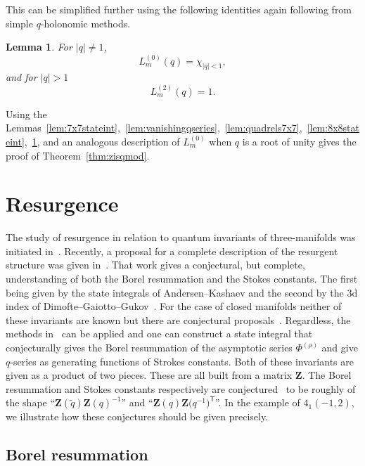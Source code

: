 \documentclass[pdftex]{sigma}
\numberwithin{equation}{section}
\newtheorem{Lemma}[Theorem]{Lemma}
\def\tq{\tilde{q}}
\def\tq{\tilde{q}}
\begin{document}
This can be simplified further using the following identities again following from simple $q$-holonomic methods.
\begin{Lemma}\label{lem:inhom.vanishingqseries}
For $|q|\neq1$,
\[
 L^{(0)}_{m}(q)
  =\chi_{|q|<1} ,
\]
and for $|q|>1$
\[
 L^{(2)}_m(q) =1 .
\]
\end{Lemma}
Using the Lemmas~\ref{lem:7x7stateint},~\ref{lem:vanishingqseries},~\ref{lem:quadrels7x7},~\ref{lem:8x8stateint},~\ref{lem:inhom.vanishingqseries}, and an analogous description of $L^{(0)}_{m}$ when $q$ is a root of unity gives the proof of Theorem~\ref{thm:zisqmod}.

\section{Resurgence}
\label{res}

The study of resurgence in relation to quantum invariants of three-manifolds was initiated in~\cite{Gar:resCS}. Recently, a proposal for a complete description of the resurgent structure was given in~\cite{GGM:I,GGMW}. That work gives a conjectural, but complete, understanding of both the Borel resummation and the Stokes constants. The first being given by the state integrals of Andersen--Kashaev and the second by the 3d index of Dimofte--Gaiotto--Gukov~\cite{DGG}. For the case of closed manifolds neither of these invariants are known but there are conjectural proposals~\cite{Gang3d}. Regardless, the methods in~\cite{GGM:I,GGMW} can be applied and one can construct a state integral that conjecturally gives the Borel resummation of the asymptotic series $\Phi^{(\rho)}$ and give $q$-series as generating functions of Strokes constants. Both of these invariants are given as a product of two pieces. These are all built from a matrix $\mathbf{Z}$. The Borel resummation and Stokes constants respectively are conjectured~\cite{GGM:I,GPPV} to be roughly of the shape
``$\mathbf{Z}(\tq)\mathbf{Z}(q)^{-1}$''  and ``$\mathbf{Z}(q)\mathbf{Z}\bigl(q^{-1}\bigr)^{\mathsf{T}}$''.
In the example of $4_1(-1,2)$, we illustrate how these conjectures should be given precisely.

\subsection{Borel resummation}
\label{canbas}
\end{document}
